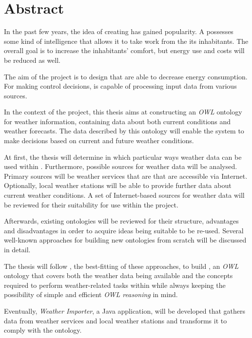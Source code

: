 \chapter*{Abstract}

In the past few years, the idea of creating \smarthomes has gained popularity. A \smarthome possesses some kind of intelligence that allows it to take work from the its inhabitants. The overall goal is to increase the inhabitants' comfort, but energy use and costs will be reduced as well.

The aim of the \thinkhome project is to design \smarthomes that are able to decrease energy consumption. For making control decisions, \thinkhome is capable of processing input data from various sources.

In the context of the \thinkhome project, this thesis aims at constructing an \emph{OWL} ontology for weather information, containing data about both current conditions and weather forecasts. The data described by this ontology will enable the \thinkhome system to make decisions based on current and future weather conditions.

At first, the thesis will determine in which particular ways weather data can be used within \thinkhome. Furthermore, possible sources for weather data will be analysed. Primary sources will be weather services that are that are accessible via Internet. Optionally, local weather stations will be able to provide further data about current weather conditions. A set of Internet-based sources for weather data will be reviewed for their suitability for use within the \thinkhome project.

Afterwards, existing ontologies will be reviewed for their structure, advantages and disadvantages in order to acquire ideas being suitable to be re-used. Several well-known approaches for building new ontologies from scratch will be discussed in detail.

The thesis will follow \methontology, the best-fitting of these approaches, to build \thinkhomeweather, an \textit{OWL} ontology that covers both the weather data being available and the concepts required to perform weather-related tasks within \thinkhome while always keeping the possibility of simple and efficient \textit{OWL reasoning} in mind.

Eventually, \emph{Weather Importer}, a Java application, will be developed that gathers data from weather services and local weather stations and transforms it to comply with the \thinkhomeweather ontology.
